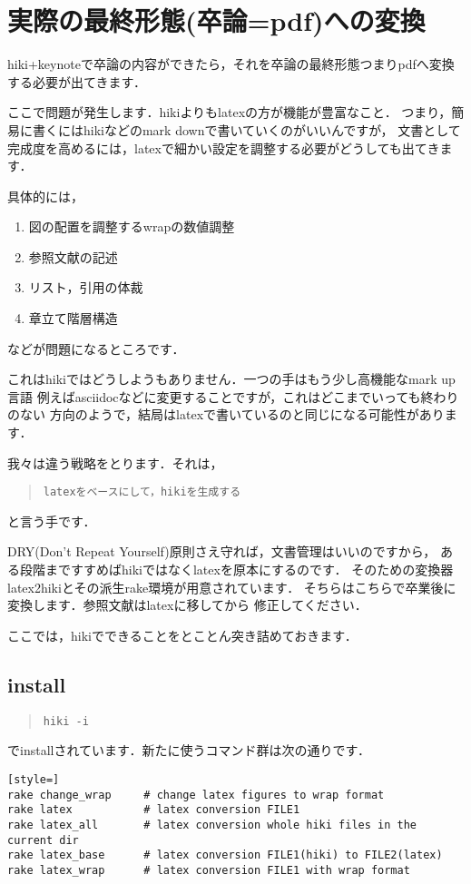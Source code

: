 
\section{実際の最終形態(卒論=pdf)への変換}
hiki+keynoteで卒論の内容ができたら，それを卒論の最終形態つまりpdfへ変換する必要が出てきます．

ここで問題が発生します．hikiよりもlatexの方が機能が豊富なこと．
つまり，簡易に書くにはhikiなどのmark downで書いていくのがいいんですが，
文書として完成度を高めるには，latexで細かい設定を調整する必要がどうしても出てきます．

具体的には，
\begin{enumerate}
\item 図の配置を調整するwrapの数値調整
\item 参照文献の記述
\item リスト，引用の体裁
\item 章立て階層構造
\end{enumerate}
などが問題になるところです．

これはhikiではどうしようもありません．一つの手はもう少し高機能なmark up言語
例えばasciidocなどに変更することですが，これはどこまでいっても終わりのない
方向のようで，結局はlatexで書いているのと同じになる可能性があります．

我々は違う戦略をとります．それは，
\begin{quote}\begin{verbatim}
latexをベースにして，hikiを生成する
\end{verbatim}\end{quote}
と言う手です．

DRY(Don't Repeat Yourself)原則さえ守れば，文書管理はいいのですから，
ある段階まですすめばhikiではなくlatexを原本にするのです．
そのための変換器latex2hikiとその派生rake環境が用意されています．
そちらはこちらで卒業後に変換します．参照文献はlatexに移してから
修正してください．

ここでは，hikiでできることをとことん突き詰めておきます．

\subsection{install}\begin{quote}\begin{verbatim}
hiki -i
\end{verbatim}\end{quote}
でinstallされています．新たに使うコマンド群は次の通りです．
\begin{lstlisting}[style=]
rake change_wrap     # change latex figures to wrap format
rake latex           # latex conversion FILE1
rake latex_all       # latex conversion whole hiki files in the current dir
rake latex_base      # latex conversion FILE1(hiki) to FILE2(latex)
rake latex_wrap      # latex conversion FILE1 with wrap format
\end{lstlisting}
